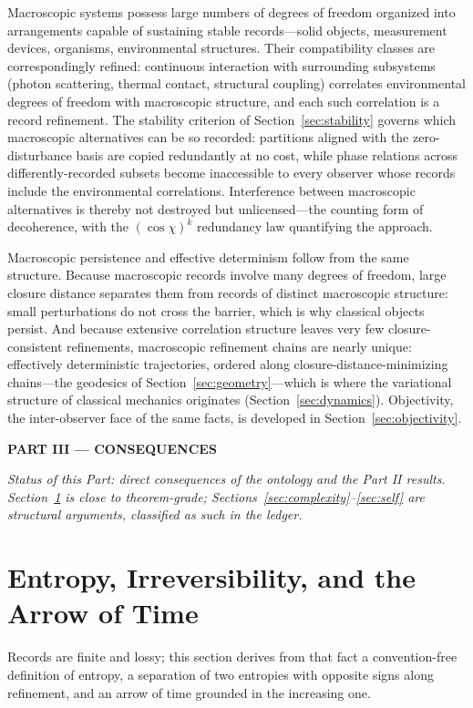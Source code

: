 \documentclass[11pt]{article}
\theoremstyle{definition}
\theoremstyle{remark}
\newcommand{\partheader}[1]{\clearpage\begin{center}{\LARGE\bfseries #1}\end{center}\vspace{1em}}
\begin{document}
Macroscopic systems possess large numbers of degrees of freedom organized into arrangements capable of sustaining stable records---solid objects, measurement devices, organisms, environmental structures. Their compatibility classes are correspondingly refined: continuous interaction with surrounding subsystems (photon scattering, thermal contact, structural coupling) correlates environmental degrees of freedom with macroscopic structure, and each such correlation is a record refinement. The stability criterion of Section~\ref{sec:stability} governs which macroscopic alternatives can be so recorded: partitions aligned with the zero-disturbance basis are copied redundantly at no cost, while phase relations across differently-recorded subsets become inaccessible to every observer whose records include the environmental correlations. Interference between macroscopic alternatives is thereby not destroyed but unlicensed---the counting form of decoherence, with the $(\cos\chi)^k$ redundancy law quantifying the approach.

Macroscopic persistence and effective determinism follow from the same structure. Because macroscopic records involve many degrees of freedom, large closure distance separates them from records of distinct macroscopic structure: small perturbations do not cross the barrier, which is why classical objects persist. And because extensive correlation structure leaves very few closure-consistent refinements, macroscopic refinement chains are nearly unique: effectively deterministic trajectories, ordered along closure-distance-minimizing chains---the geodesics of Section~\ref{sec:geometry}---which is where the variational structure of classical mechanics originates (Section~\ref{sec:dynamics}). Objectivity, the inter-observer face of the same facts, is developed in Section~\ref{sec:objectivity}.

\partheader{PART III --- CONSEQUENCES}
\emph{Status of this Part: direct consequences of the ontology and the Part II results. Section~\ref{sec:entropy} is close to theorem-grade; Sections~\ref{sec:complexity}--\ref{sec:self} are structural arguments, classified as such in the ledger.}

\section{Entropy, Irreversibility, and the Arrow of Time}\label{sec:entropy}
Records are finite and lossy; this section derives from that fact a convention-free definition of entropy, a separation of two entropies with opposite signs along refinement, and an arrow of time grounded in the increasing one.
\end{document}
